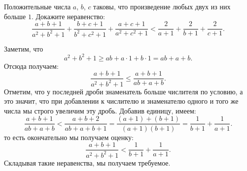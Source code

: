 \problem
Положительные числа $a$, $b$, $c$ таковы, что произведение любых двух из них
больше $1$.
Докажите неравенство:
\[
   \frac{a + b + 1}{a^2 + b^2 + 1}
   +
   \frac{b + c + 1}{b^2 + c^2 + 1}
   +
   \frac{a + c + 1}{a^2 + c^2 + 1}
<
   \frac{2}{a + 1} + \frac{2}{b + 1} + \frac{2}{c + 1}
.\]

\solution
Заметим, что
\[
   a^2 + b^2 + 1
\geq
   a b + a \cdot 1 + b \cdot 1
=
   a b + a + b
.\]
Отсюда получаем:
\[
   \frac{a + b + 1}{a^2 + b^2 + 1}
\leq
   \frac{a + b + 1}{a b + a + b}
.\]
Отметим, что у последней дроби знаменатель больше числителя по условию, а это
значит, что при добавлении к числителю и знаменателю одного и того же числа мы
строго увеличим эту дробь.
Добавив единицу, имеем:
\[
   \frac{a + b + 1}{a b + a + b}
<
   \frac{a + b + 2}{a b + a + b + 1}
=
   \frac{(a + 1) + (b + 1)}{(a + 1) (b + 1)}
=
   \frac{1}{b + 1}
   +
   \frac{1}{a + 1}
.\]
то есть окончательно мы получаем оценку:
\[
   \frac{a + b + 1}{a^2 + b^2 + 1}
<
   \frac{1}{b + 1} + \frac{1}{a + 1}
.\]
Складывая такие неравенства, мы получаем требуемое.

\endproblem
